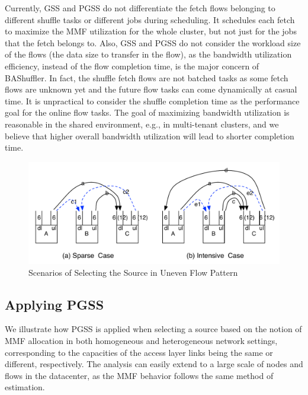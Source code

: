 \documentclass[10pt,journal,compsoc]{IEEEtran}
\begin{document}
Currently, GSS and PGSS do not differentiate the fetch flows belonging to different shuffle tasks or different jobs during scheduling. 
It schedules each fetch to maximize the MMF utilization for the whole cluster, but not just for the jobs that the fetch belongs to. 
Also, GSS and PGSS do not consider the workload size of the flows (the data size to transfer in the flow), as the bandwidth utilization efficiency, instead of the flow completion time, is the major concern of BAShuffler. 
In fact, the shuffle fetch flows are not batched tasks as some fetch flows are unknown yet and the future flow tasks can come dynamically at casual time.
It is unpractical to consider the shuffle completion time as the performance goal for the online flow tasks.
The goal of maximizing bandwidth utilization is reasonable in the shared environment, e.g., in multi-tenant clusters, and we believe that higher overall bandwidth utilization will lead to shorter completion time.



\begin{figure}[!t]
\centering

\includegraphics[width=1\columnwidth]{figure3}

\caption{Scenarios of Selecting the Source in Uneven Flow Pattern}
\label{fig:network}
\end{figure}

\subsection{Applying PGSS}\label{section:analysis}
We illustrate how PGSS is applied when selecting a source based on the
notion of MMF allocation in both homogeneous and heterogeneous
network settings, corresponding to the capacities
of the access layer links being the same or different, respectively.
The analysis can easily extend to a large scale of nodes and flows in
the datacenter, as the MMF behavior follows the same
method of estimation.
\end{document}
